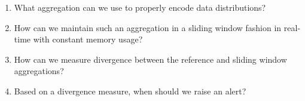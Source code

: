 \begin{enumerate}[leftmargin=1.5cm, label=\textbf{(RQ\arabic*)}]
    \item What aggregation can we use to properly encode data distributions?
    \item How can we maintain such an aggregation in a sliding window fashion in real-time with constant memory usage?
    \item How can we measure divergence between the reference and sliding window aggregations?
    \item Based on a divergence measure, when should we raise an alert?
\end{enumerate}



%
%
%
%
%




